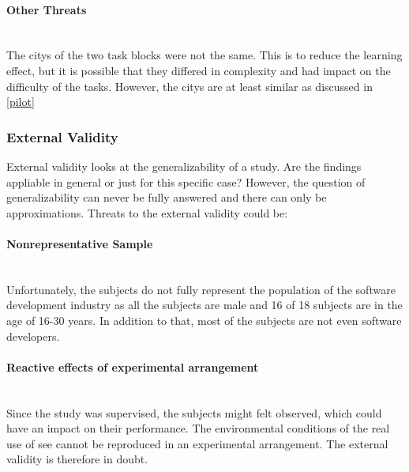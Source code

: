\paragraph{Other Threats}\mbox{}\\
The \glspl{city} of the two task blocks were not the same. 
This is to reduce the learning effect, but it is possible that they differed in complexity and had impact on the difficulty of the tasks.
However, the \glspl{city} are at least similar as discussed in \ref{pilot}
\subsubsection{External Validity}
External validity looks at the generalizability of a study.
Are the findings appliable in general or just for this specific case?
However, the question of generalizability can never be fully answered and there can only be approximations. 
Threats to the external validity could be:

\paragraph{Nonrepresentative Sample}\mbox{}\\
Unfortunately, the subjects do not fully represent the population of the software development industry as all the subjects are male and 16 of 18 subjects are in the age of 16-30 years.
In addition to that, most of the subjects are not even software developers.

\paragraph{Reactive effects of experimental arrangement}\mbox{}\\
Since the study was supervised, the subjects might felt observed, which could have an impact on their performance.
The environmental conditions of the real use of \gls{see} cannot be reproduced in an experimental arrangement.
The external validity is therefore in doubt.